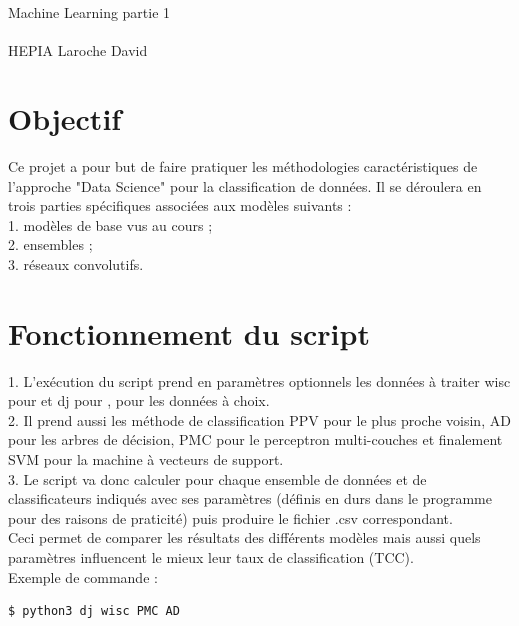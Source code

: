 \documentclass[10pt,letterpaper]{article}
\begin{document}
\vspace*{0.2in}

\centerline{\Large{Machine Learning partie 1}}%
\vspace{10mm}

HEPIA Laroche David\textsuperscript{}

\section*{Objectif}
Ce projet a pour but de faire pratiquer les méthodologies caractéristiques de l’approche "Data
Science" pour la classification de données. Il se déroulera en trois parties spécifiques associées
aux modèles suivants :
\\
1. modèles de base vus au cours ;
\\
2. ensembles ;
\\
3. réseaux convolutifs.


\section*{Fonctionnement du script}

\hspace{\parindent} 1. L’exécution du script prend en paramètres optionnels les données à traiter wisc pour  et dj pour , pour les données à choix.\\
2. Il prend aussi les méthode de classification PPV pour le plus proche voisin, AD pour les arbres de décision, PMC pour le perceptron multi-couches et finalement SVM pour la machine à vecteurs de support.\\
3. Le script va donc calculer pour chaque ensemble de données et de classificateurs indiqués avec ses paramètres (définis en durs dans le programme pour des raisons de praticité) puis produire le fichier .csv correspondant.\\
\vspace{1mm}
Ceci permet de comparer les résultats des différents modèles mais aussi quels paramètres influencent le mieux leur taux de classification (TCC).\\
\vspace{1mm}
Exemple de commande :
\begin{lstlisting}[language=bash]
  $ python3 dj wisc PMC AD
\end{lstlisting}
\end{document}
